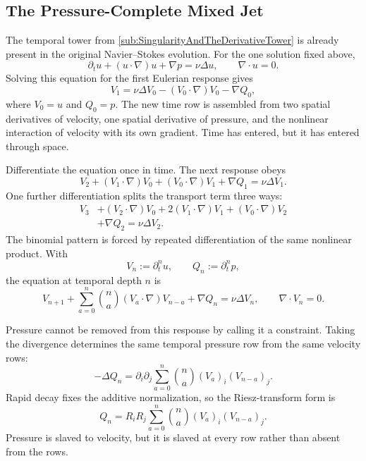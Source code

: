 
\subsection{The Pressure-Complete Mixed Jet}\label{sub:ThePressureCompleteMixedJet}

The temporal tower from \cref{sub:SingularityAndTheDerivativeTower} is already present in the original Navier--Stokes evolution.
For the one solution fixed above,
\[
  \partial_tu+(u\cdot\nabla)u+\nabla p
  =
  \nu\Delta u,
  \qquad
  \nabla\cdot u=0.
\]
Solving this equation for the first Eulerian response gives
\[
  V_1
  =
  \nu\Delta V_0-(V_0\cdot\nabla)V_0-\nabla Q_0,
\]
where \(V_0=u\) and \(Q_0=p\).
The new time row is assembled from two spatial derivatives of velocity, one spatial derivative of pressure, and the nonlinear interaction of velocity with its own gradient.
Time has entered, but it has entered through space.

Differentiate the equation once in time.
The next response obeys
\[
  V_2
  +(V_1\cdot\nabla)V_0
  +(V_0\cdot\nabla)V_1
  +\nabla Q_1
  =
  \nu\Delta V_1.
\]
One further differentiation splits the transport term three ways:
\begin{align*}
  V_3
  &+(V_2\cdot\nabla)V_0
  +2(V_1\cdot\nabla)V_1
  +(V_0\cdot\nabla)V_2
  \\
  &+\nabla Q_2
  =
  \nu\Delta V_2.
\end{align*}
The binomial pattern is forced by repeated differentiation of the same nonlinear product.
With
\[
  V_n:=\partial_t^n u,
  \qquad
  Q_n:=\partial_t^n p,
\]
the equation at temporal depth \(n\) is
\[
  V_{n+1}
  +
  \sum_{a=0}^{n}
  \binom{n}{a}
  (V_a\cdot\nabla)V_{n-a}
  +\nabla Q_n
  =
  \nu\Delta V_n,
  \qquad
  \nabla\cdot V_n=0.
\]

Pressure cannot be removed from this response by calling it a constraint.
Taking the divergence determines the same temporal pressure row from the same velocity rows:
\[
  -\Delta Q_n
  =
  \partial_i\partial_j
  \sum_{a=0}^{n}
  \binom{n}{a}
  (V_a)_i(V_{n-a})_j.
\]
Rapid decay fixes the additive normalization, so the Riesz-transform form is
\[
  Q_n
  =
  R_iR_j
  \sum_{a=0}^{n}
  \binom{n}{a}
  (V_a)_i(V_{n-a})_j.
\]
Pressure is slaved to velocity, but it is slaved at every row rather than absent from the rows.

